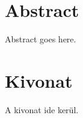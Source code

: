 \documentclass[12pt,a4paper,english,magyar,oneside]{report}
\begin{document}


\chapter*{Abstract}

Abstract goes here.


\chapter*{Kivonat}

A kivonat ide kerül.


\setcounter{tocdepth}{2} %
\tableofcontents %






\end{document}
